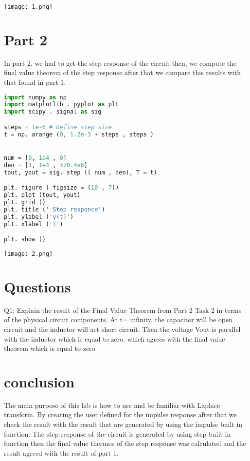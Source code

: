 \documentclass[12pt]{report}
\begin{document}
\texttt{[image: 1.png]}

\section{Part 2 }

In part 2, we had to get the step response of the circuit then, we compute the final value theorem of the step response after that we compare this results with that found in part 1. 

\begin{lstlisting}[language=Python]
import numpy as np
import matplotlib . pyplot as plt
import scipy . signal as sig

steps = 1e-6 # Define step size
t = np. arange (0, 1.2e-3 + steps , steps ) 


num = [0, 1e4 , 0]
den = [1, 1e4 , 370.4e6]
tout, yout = sig. step (( num , den), T = t)

plt. figure ( figsize = (10 , 7))
plt. plot (tout, yout)
plt. grid ()
plt. title (' Step responce')
plt. ylabel ('y(t)')
plt. xlabel ('t')

plt. show ()


\end{lstlisting}

\texttt{[image: 2.png]}



\section{Questions}
Q1: Explain the result of the Final Value Theorem from Part 2 Task 2 in terms of the physical
circuit components.
At t= infinity, the capacitor will be open circuit and the inductor will act short circuit. Then the voltage Vout is parallel with the inductor which is equal to zero. which agrees with the final value theorem which is equal to zero.  





\section{conclusion}


The main purpose of this lab is how to use and be familiar with Laplace transform. By creating the user defined for the impulse response after that we check the result with the result that are generated by using the impulse built in function. The step response of the circuit is generated by using step built in function then the final value thermos of the step response was calculated and the result agreed with the result of part 1.

\newpage
\end{document}
